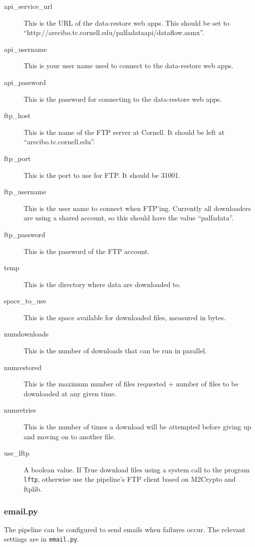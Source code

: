 \documentclass[12pt]{article}
\begin{document}
\begin{description}
    \item[api\_service\_url] This is the URL of the data-restore web apps. This should be set to ``http://arecibo.tc.cornell.edu/palfadataapi/dataflow.asmx''.
    \item[api\_username] This is your user name used to connect to the data-restore web apps.
    \item[api\_password] This is the password for connecting to the data-restore web apps.
    \item[ftp\_host] This is the name of the FTP server at Cornell. It should be left at ``arecibo.tc.cornell.edu''.
    \item[ftp\_port] This is the port to use for FTP. It should be 31001.
    \item[ftp\_username] This is the user name to connect when FTP'ing. Currently all downloaders are using a shared account, so this should have the value ``palfadata''.
    \item[ftp\_password] This is the password of the FTP account.
    \item[temp] This is the directory where data are downloaded to.
    \item[space\_to\_use] This is the space available for downloaded files, measured in bytes.
    \item[numdownloads] This is the number of downloads that can be run in parallel.
    \item[numrestored] This is the maximum number of files requested + number of files to be downloaded at any given time.
    \item[numretries] This is the number of times a download will be attempted before giving up and moving on to another file.
    \item[use\_lftp] A boolean value. If True download files using a system call to the program \texttt{lftp}, otherwise use the pipeline's FTP client based on M2Crypto and ftplib.
\end{description}


\subsubsection{email.py}
The pipeline can be configured to send emails when failures occur. The relevant settings are in \texttt{email.py}.
\end{document}
